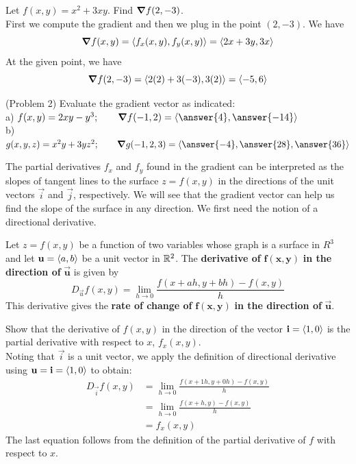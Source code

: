 \documentclass[handout]{ximera}
\begin{document}
\begin{example}[Example 2]
Let $f(x,y) = x^2 + 3xy$.  Find $\boldsymbol\nabla f(2, -3)$.\\
First we compute the gradient and then we plug in the point $(2, -3)$.  We have
\[
\boldsymbol\nabla f(x,y) = \left\langle f_x(x,y), f_y(x,y)\right\rangle = \left\langle 2x + 3y, 3x\right\rangle
\]
At the given point, we have
\[
\boldsymbol\nabla f(2, -3) = \left\langle 2(2) + 3(-3), 3(2)\right\rangle = \left\langle -5, 6\right\rangle
\]
\end{example}

\begin{problem}(Problem 2)
Evaluate the gradient vector as indicated:\\
a) \;$f(x,y) = 2xy - y^3; \qquad \grad f(-1, 2)= \vector{\answer{4}, \answer{-14}}$\\
b) \;$g(x, y, z) = x^2y + 3yz^2; \qquad \grad g(-1,2,3) = 
\vector{\answer{-4}, \answer{28}, \answer{36}}$\\
\end{problem}

The partial derivatives $f_x$ and $f_y$ found in the gradient can be interpreted as 
the slopes of tangent lines to the surface $z = f(x,y)$ in the directions of 
the unit vectors $\vec i$ and $\vec j$, respectively. 
We will see that the gradient vector 
can help us find the slope of the surface in any direction. 
We first need the notion of a directional derivative.



\begin{definition}
Let $z = f(x,y)$ be a function of two variables whose graph is a surface in $R^3$ and 
let $\mathbf u = \left\langle a,b\right\rangle$ be a unit vector in $\mathbb R^2$.
The \textbf{derivative of} $\mathbf{f(x,y)}$ \textbf{in the direction of} 
$\mathbf{\vec u}$ is given by
\[
D_{\vec u} f(x,y) = \lim_{h \to 0} \frac{f(x + ah, y + bh) -f(x,y)}{h}
\]
This derivative gives the \textbf{rate of change of} $\mathbf{f(x,y)}$ 
\textbf{in the direction of} $\mathbf{\vec u}$.
\end{definition}

\begin{example}[Example 3]
Show that the derivative of $f(x,y)$ in the direction of the vector 
$\mathbf i = \left\langle 1,0\right\rangle$ is the 
partial derivative with respect to $x$, $f_x(x,y)$.\\
Noting that $\vec i$ is a unit vector, we apply the definition of directional 
derivative using $\mathbf u = \mathbf i = \left\langle 1,0\right\rangle$ to obtain:
\begin{align*}
D_{\vec i} f(x,y) &= \lim_{h \to 0} \frac{f(x + 1h, y + 0h) -f(x,y)}{h}\\
                  &= \lim_{h \to 0} \frac{f(x + h, y) -f(x,y)}{h}\\
                  &= f_x(x,y)
\end{align*}
The last equation follows from the definition of the partial derivative 
of $f$ with respect to $x$.
\end{example}
\end{document}

